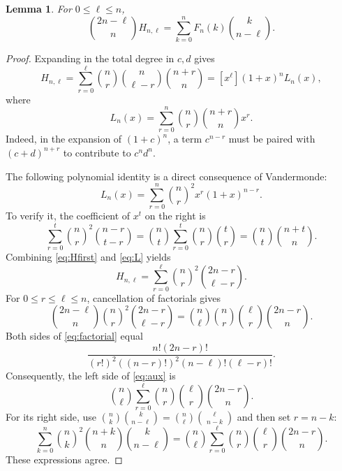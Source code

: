 \documentclass[11pt]{article}
\newtheorem{lemma}{Lemma}
\newcommand{\bn}[2]{\binom{#1}{#2}}
\begin{document}
\begin{lemma}\label{lem:aux}
For $0\leq\ell\leq n$,
\begin{equation}\label{eq:aux}
 \bn{2n-\ell}n H_{n,\ell}
   =\sum_{k=0}^{n}F_n(k)\bn{k}{n-\ell}.
\end{equation}
\end{lemma}
\begin{proof}
Expanding in the total degree in $c,d$ gives
\begin{equation}\label{eq:Hfirst}
 H_{n,\ell}=\sum_{r=0}^{\ell}
 \bn nr\bn n{\ell-r}\bn{n+r}n
 =[x^\ell](1+x)^n L_n(x),
\end{equation}
where
\[
 L_n(x)=\sum_{r=0}^{n}\bn nr\bn{n+r}n x^r.
\]
Indeed, in the expansion of $(1+c)^n$, a term $c^{n-r}$
must be paired with $(c+d)^{n+r}$ to contribute to $c^nd^n$.

The following polynomial identity is a direct consequence of Vandermonde:
\begin{equation}\label{eq:L}
 L_n(x)=\sum_{r=0}^{n}\bn nr^2 x^r(1+x)^{n-r}.
\end{equation}
To verify it, the coefficient of $x^t$ on the right is
\[
 \sum_{r=0}^{t}\bn nr^2\bn{n-r}{t-r}
 =\bn nt\sum_{r=0}^{t}\bn nr\bn tr
 =\bn nt\bn{n+t}n.
\]
Combining \eqref{eq:Hfirst} and \eqref{eq:L} yields
\begin{equation}\label{eq:Hsecond}
 H_{n,\ell}=\sum_{r=0}^{\ell}
 \bn nr^2\bn{2n-r}{\ell-r}.
\end{equation}
For $0\leq r\leq\ell\leq n$, cancellation of factorials gives
\begin{equation}\label{eq:factorial}
 \bn{2n-\ell}n\bn nr^2\bn{2n-r}{\ell-r}
 =\bn n\ell\bn nr\bn\ell r\bn{2n-r}n.
\end{equation}
Both sides of \eqref{eq:factorial} equal
\[
 \frac{n!(2n-r)!}
 {(r!)^2((n-r)!)^2(n-\ell)!(\ell-r)!}.
\]
Consequently, the left side of \eqref{eq:aux} is
\[
 \bn n\ell\sum_{r=0}^{\ell}\bn nr\bn\ell r\bn{2n-r}n.
\]
For its right side, use
$\bn nk\bn{k}{n-\ell}
 =\bn n\ell\bn\ell{n-k}$ and then set $r=n-k$:
\[
 \sum_{k=0}^{n}\bn nk^2\bn{n+k}n\bn{k}{n-\ell}
 =\bn n\ell\sum_{r=0}^{\ell}
   \bn nr\bn\ell r\bn{2n-r}n.
\]
These expressions agree.
\end{proof}
\end{document}
